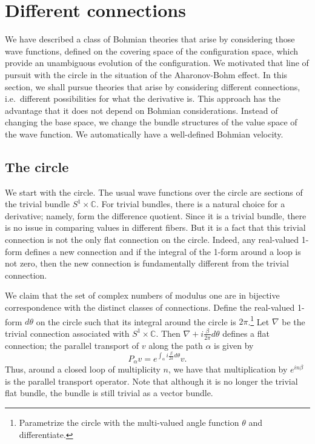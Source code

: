 \documentclass[11pt]{article}
\theoremstyle{remark}
\begin{document}
\section{Different connections} \label{s:fb}

We have described a class of Bohmian theories that arise by considering
those wave functions,  defined on the covering space of the configuration
space, which provide an unambiguous evolution of the
configuration.
We motivated that line of pursuit with the circle in the
situation of the Aharonov-Bohm effect. In this section, we shall
pursue theories that arise by considering different connections, i.e.\
different possibilities for what the derivative is. This approach has
the advantage that it does not depend on Bohmian
considerations. 
Instead of changing the base space, we change the bundle
structures of the value space of the wave function. 
We automatically have a well-defined Bohmian velocity. 

\subsection{The circle}
We start with the circle. The usual wave functions over the circle are
sections of the trivial bundle $S^1 \times \ensuremath{\mathbb{C}}$. For trivial
bundles, there is a natural choice for a derivative; namely, form the
difference quotient. Since it is a trivial bundle, there is no issue
in comparing values in different fibers. But it is a fact that this
trivial connection is not the only flat connection on the circle. 
Indeed, any real-valued 1-form defines a new connection and if the
integral of the 1-form around a loop is not zero, then the new
connection is fundamentally different from the trivial connection. 

We claim that the set of complex numbers of modulus one are in
bijective correspondence with the distinct classes of connections.
Define
the real-valued 1-form  $d\theta$ on the circle such that its integral
around the circle is $2\pi$.\footnote{Parametrize the circle with the
multi-valued angle function $\theta$ and
differentiate. 
} Let
$\nabla$ be the trivial connection associated with
$S^1 \times \ensuremath{\mathbb{C}}$. Then $\nabla + i\frac{\beta}{2\pi}
d\theta$ defines a flat connection; the parallel transport of $v$
along the path 
$\alpha$ is given by
\begin{equation*}
\ensuremath{P_{{\alpha}}{v}} = e^{\int_{\alpha}i\frac{\beta}{2\pi}d\theta} v. 
\end{equation*}
Thus, around a closed loop of multiplicity $n$,
we have that multiplication by $e^{i n \beta}$ 
is the parallel transport operator. 
Note that although it is no longer the trivial flat bundle, the
bundle is still trivial as a vector bundle. 
\end{document}
